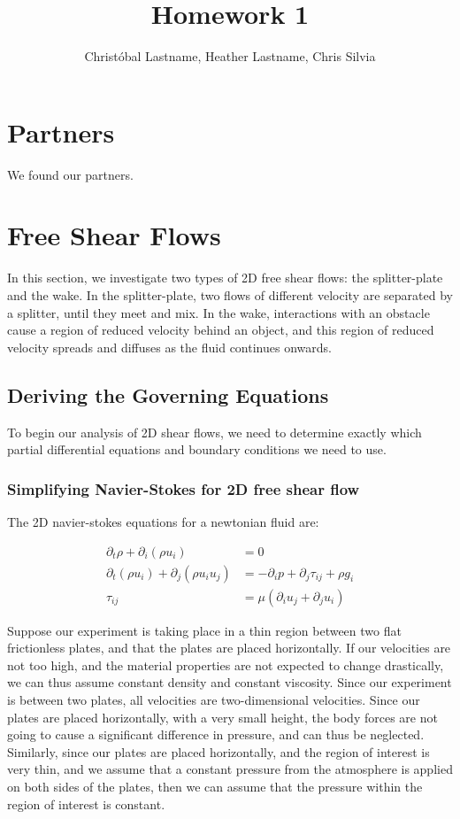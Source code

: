 \documentclass{article}
\title{Homework 1}
\author{Christóbal Lastname, Heather Lastname, Chris Silvia}
\begin{document}
\maketitle

\section{Partners}

We found our partners.

\section{Free Shear Flows}

In this section, we investigate two types of 2D free shear flows:
	the splitter-plate and the wake.
In the splitter-plate, two flows of different velocity are separated by
	a splitter, until they meet and mix.
In the wake, interactions with an obstacle cause a region of reduced
	velocity behind an object, and this region of reduced
	velocity spreads and diffuses as the fluid continues onwards.

\subsection{Deriving the Governing Equations}

To begin our analysis of 2D shear flows, we need to determine exactly 
	which partial differential equations and boundary conditions
	we need to use.

\subsubsection{Simplifying Navier-Stokes for 2D free shear flow}

The 2D navier-stokes equations for a newtonian fluid are:

\begin{align}
\partial_t \rho + \partial_i \left( \rho u_i \right) & = 0 \\
\partial_t \left( \rho u_i \right) + \partial_j \left( \rho u_i u_j \right)
	& = - \partial_i p + \partial_j \tau_{ij} + \rho g_i\\
\tau_{ij} & = \mu \left( \partial_i u_j + \partial_j u_i \right)
\end{align}

Suppose our experiment is taking place in a thin region between two
	flat frictionless plates, and that the plates are placed horizontally.
If our velocities are not too high, and the material properties are not
	expected to change drastically, we can thus assume constant
	density and constant viscosity.
Since our experiment is between two plates, all velocities are two-dimensional
	velocities.
Since our plates are placed horizontally, with a very small height,
	the body forces are not going to cause a significant difference
	in pressure, and can thus be neglected.
Similarly, since our plates are placed horizontally, and the region
	of interest is very thin, and we assume that a constant pressure
	from the atmosphere is applied on both sides of the plates,
	then we can assume that the pressure within the region of 
	interest is constant.
\end{document}
